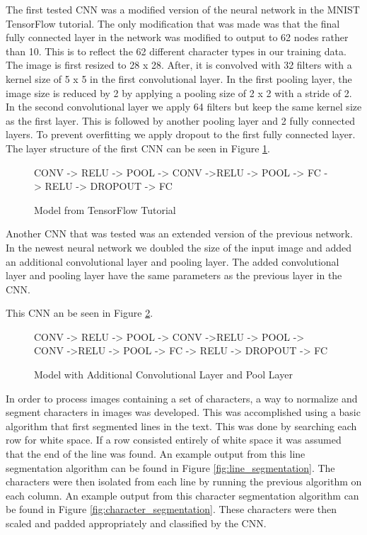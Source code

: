 \documentclass[11pt]{article}
\begin{document}
    The first tested CNN was a modified version of the neural network in the MNIST TensorFlow tutorial. \cite{tensorflow15-whitepaper} The only modification that was made was that the final fully connected layer in the network was modified to output to 62 nodes rather than 10.  This is to reflect the 62 different character types in our training data. The image is first resized to 28 x 28. After, it is convolved with 32 filters with a kernel size of 5 x 5 in the first convolutional layer. In the first pooling layer, the image size is reduced by 2 by applying a pooling size of 2 x 2 with a stride of 2. In the second convolutional layer we apply 64 filters but keep the same kernel size as the first layer. This is followed by another pooling layer and 2 fully connected layers. To prevent overfitting we apply dropout to the first fully connected layer. The layer structure of the first CNN can be seen in Figure \ref{fig:model_1}.
    
    \begin{figure}
        \centering
        \begin{framed}
        CONV -\>> RELU -> POOL -> CONV ->RELU -> POOL -> FC -> RELU -> DROPOUT -> FC
        \end{framed}
        \caption{Model from TensorFlow Tutorial}
        \label{fig:model_1}
    \end{figure}
    
    Another CNN that was tested was an extended version of the previous network. In the newest neural network we doubled the size of the input image and added an additional convolutional layer and pooling layer. The added convolutional layer and pooling layer have the same parameters as the previous layer in the CNN.
    
    This CNN an be seen in Figure \ref{fig:model_2}.
    
    \begin{figure}
        \centering
        \begin{framed}
        CONV -\>> RELU -> POOL -> CONV ->RELU -> POOL -> CONV ->RELU -> POOL -> FC -> RELU -> DROPOUT -> FC
        \end{framed}
        \caption{Model with Additional Convolutional Layer and Pool Layer}
        \label{fig:model_2}
    \end{figure}
    
    In order to process images containing a set of characters, a way to normalize and segment characters in images was developed. This was accomplished using a basic algorithm that first segmented lines in the text. This was done by searching each row for white space. If a row consisted entirely of white space it was assumed that the end of the line was found. An example output from this line segmentation algorithm can be found in Figure \ref{fig:line_segmentation}. The characters were then isolated from each line by running the previous algorithm on each column. An example output from this character segmentation algorithm can be found in Figure \ref{fig:character_segmentation}. These characters were then scaled and padded appropriately and classified by the CNN.
    
\end{document}
